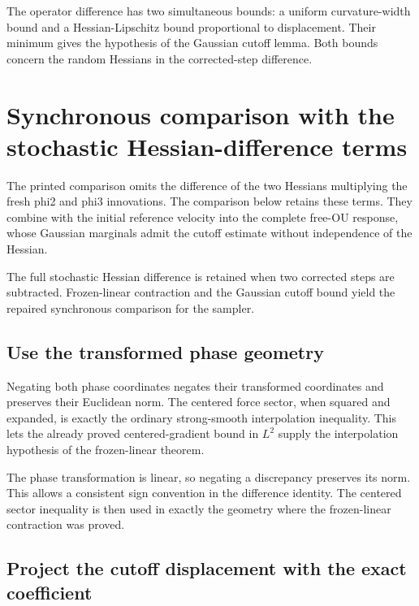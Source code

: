 \documentclass[11pt,a4paper]{report}
\begin{document}
The operator difference has two simultaneous bounds: a uniform curvature-width bound and a Hessian-Lipschitz bound proportional to displacement. Their minimum gives the hypothesis of the Gaussian cutoff lemma. Both bounds concern the random Hessians in the corrected-step difference.

\section{\texorpdfstring{Synchronous comparison with the stochastic Hessian-difference terms}{Synchronous comparison with the stochastic Hessian-difference terms}}
\label{proof-module-KineticLangevin-SecondOrderComparison-lean}


The printed comparison omits the difference of the two Hessians multiplying the fresh phi2 and phi3 innovations. The comparison below retains these terms. They combine with the initial reference velocity into the complete free-OU response, whose Gaussian marginals admit the cutoff estimate without independence of the Hessian.



The full stochastic Hessian difference is retained when two corrected steps are subtracted. Frozen-linear contraction and the Gaussian cutoff bound yield the repaired synchronous comparison for the sampler.

\subsection{\texorpdfstring{Use the transformed phase geometry}{Use the transformed phase geometry}}
\label{report-step-KineticLangevin-SecondOrderComparison-lean-1}


Negating both phase coordinates negates their transformed coordinates and preserves their Euclidean norm. The centered force sector, when squared and expanded, is exactly the ordinary strong-smooth interpolation inequality. This lets the already proved centered-gradient bound in \(L^{2}\) supply the interpolation hypothesis of the frozen-linear theorem.



The phase transformation is linear, so negating a discrepancy preserves its norm. This allows a consistent sign convention in the difference identity. The centered sector inequality is then used in exactly the geometry where the frozen-linear contraction was proved.

\subsection{\texorpdfstring{Project the cutoff displacement with the exact coefficient}{Project the cutoff displacement with the exact coefficient}}
\label{report-step-KineticLangevin-SecondOrderComparison-lean-2}
\end{document}
